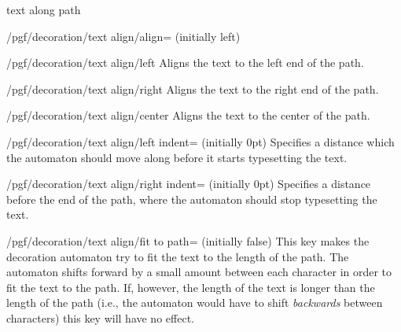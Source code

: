 \begin{decoration}{text along path}
\begin{key}{/pgf/decoration/text align/align= (initially left)}
\end{key}

\begin{stylekey}{/pgf/decoration/text align/left}
  Aligns the text to the left end of the path.

\end{stylekey}

\begin{stylekey}{/pgf/decoration/text align/right}
  Aligns the text to the right end of the path.
\end{stylekey}

\begin{stylekey}{/pgf/decoration/text align/center}
  Aligns the text to the center of the path.
\end{stylekey}

\begin{key}{/pgf/decoration/text align/left indent= (initially 0pt)}
  Specifies a distance which the automaton should move along
  before it starts typesetting the text.
\end{key}

\begin{key}{/pgf/decoration/text align/right indent= (initially 0pt)}
  Specifies a distance before the end of the path, where
  the automaton should stop typesetting the text.
\end{key}

\begin{key}{/pgf/decoration/text align/fit to path= (initially false)}
  This key makes the decoration automaton try to fit the text
  to the length of the path. The automaton shifts forward
  by a small amount between each character in order to fit the
  text to the path. If, however, the length of the text is longer
  than the length of the path (i.e., the automaton would have to
  shift \emph{backwards} between characters) this key will
  have no effect.

\begin{codeexample}[]
\end{codeexample}

\end{key}


\end{decoration}
